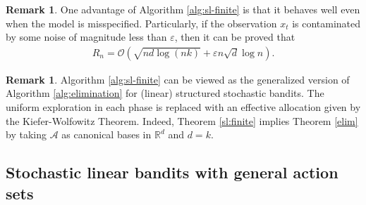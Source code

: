 \documentclass[10pt,a4article]{article}
\numberwithin{equation}{section}
\theoremstyle{plain}
\theoremstyle{definition}
\newtheorem{Rem}[Th]{Remark}
\def\R{{\mathbb R}}
\def\R{{\mathbb R}}
\def\e{{\varepsilon}}
\begin{document}
\begin{Rem}
One advantage of Algorithm \ref{alg:sl-finite} is that it behaves well even when the model is misspecified. Particularly, if the observation $x_t$ is contaminated by some noise of magnitude less than $\e$, then it can be proved that 
\begin{align*}
R_n=\mathcal O\left(\sqrt{nd\log (nk)}+\e n\sqrt{d}\log n\right). 
\end{align*}
\end{Rem}

\begin{Rem}
Algorithm \ref{alg:sl-finite} can be viewed as the generalized version of Algorithm \ref{alg:elimination} for (linear) structured stochastic bandits. The uniform exploration in each phase is replaced with an effective allocation given by the Kiefer-Wolfowitz Theorem. Indeed, Theorem \ref{sl:finite} implies Theorem \ref{elim} by taking $\mathcal A$ as canonical bases in $\R^d$ and $d=k$.  
\end{Rem}

\subsection{Stochastic linear bandits with general action sets}
\end{document}

